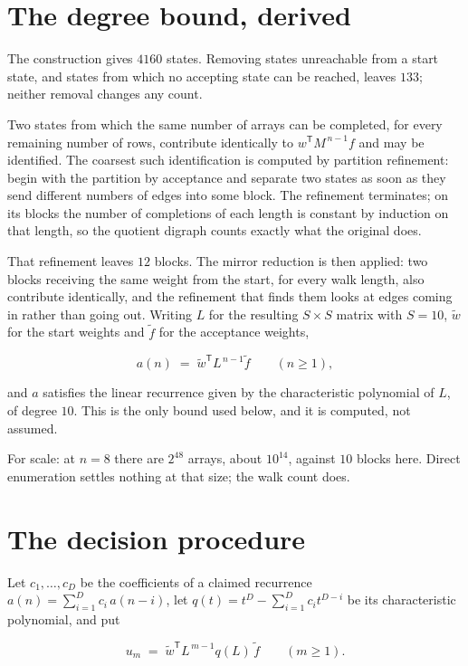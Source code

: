 \documentclass[11pt]{article}
\theoremstyle{definition}
\begin{document}
\section{The degree bound, derived}

The construction gives $4160$ states. Removing states unreachable from a start state, and states from which no accepting state can be reached, leaves $133$; neither removal changes any count.

Two states from which the same number of arrays can be completed, for every remaining number of rows, contribute identically to $w^{\mathsf T}M^{\,n-1}f$ and may be identified. The coarsest such identification is computed by partition refinement: begin with the partition by acceptance and separate two states as soon as they send different numbers of edges into some block. The refinement terminates; on its blocks the number of completions of each length is constant by induction on that length, so the quotient digraph counts exactly what the original does.

That refinement leaves $12$ blocks. The mirror reduction is then applied: two blocks receiving the same weight from the start, for every walk length, also contribute identically, and the refinement that finds them looks at edges coming in rather than going out. Writing $L$ for the resulting $S \times S$ matrix with $S = 10$, $\tilde w$ for the start weights and $\tilde f$ for the acceptance weights,

\[a(n) \;=\; \tilde w^{\mathsf T} L^{\,n-1} \tilde f \qquad (n \ge 1),\]

and $a$ satisfies the linear recurrence given by the characteristic polynomial of $L$, of degree $10$. This is the only bound used below, and it is computed, not assumed.

For scale: at $n = 8$ there are $2^{48}$ arrays, about $10^{14}$, against $10$ blocks here. Direct enumeration settles nothing at that size; the walk count does.

\section{The decision procedure}

Let $c_1,\dots,c_D$ be the coefficients of a claimed recurrence $a(n) = \sum_{i=1}^{D} c_i\,a(n-i)$, let $q(t) = t^{D} - \sum_{i=1}^{D} c_i t^{D-i}$ be its characteristic polynomial, and put

\[u_m \;=\; \tilde w^{\mathsf T} L^{\,m-1} q(L)\,\tilde f \qquad (m \ge 1).\]
\end{document}

